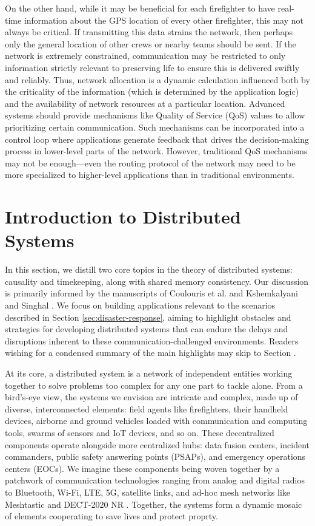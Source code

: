 \documentclass[]             %
{NASA}                       %
\theoremstyle{definition}
\begin{document}
On the other hand, while it may be beneficial for each firefighter to
have real-time information about the GPS location of every other
firefighter, this may not always be critical. If transmitting this
data strains the network, then perhaps only the general location of
other crews or nearby teams should be sent. If the network is
extremely constrained, communication may be restricted to only
information strictly relevant to preserving life to ensure this is
delivered swiftly and reliably. Thus, network allocation is a dynamic
calculation influenced both by the criticality of the information
(which is determined by the application logic) and the availability of
network resources at a particular location. Advanced systems should
provide mechanisms like Quality of Service (QoS) values to allow
prioritizing certain communication. Such mechanisms can be
incorporated into a control loop where applications generate feedback
that drives the decision-making process in lower-level parts of the
network. However, traditional QoS mechanisms may not be enough---even
the routing protocol of the network may need to be more specialized to
higher-level applications than in traditional environments.

\section{Introduction to Distributed Systems}
\label{sec:background}
In this section, we distill two core topics in the theory of
distributed systems: causality and timekeeping, along with shared
memory consistency.  Our discussion is primarily informed by the
manuscripts of Coulouris et al.  \cite{coulouris2005distributed} and
Kshemkalyani and Singhal \cite{kshemkalyani_singhal_2008}. We focus on
building applications relevant to the scenarios described in Section
\ref{sec:disaster-response}, aiming to highlight obstacles and
strategies for developing distributed systems that can endure the
delays and disruptions inherent to these communication-challenged
environments. Readers wishing for a condensed summary of the main
highlights may skip to Section \label{ssec:background-summary}.

At its core, a distributed system is a network of independent entities
working together to solve problems too complex for any one part to
tackle alone. From a bird’s-eye view, the systems we envision are
intricate and complex, made up of diverse, interconnected elements:
field agents like firefighters, their handheld devices, airborne and
ground vehicles loaded with communication and computing tools, swarms
of sensors and IoT devices, and so on. These decentralized components
operate alongside more centralized hubs: data fusion centers, incident
commanders, public safety answering points (PSAPs), and emergency
operations centers (EOCs). We imagine these components being woven
together by a patchwork of communication technologies ranging from
analog and digital radios to Bluetooth, Wi-Fi, LTE, 5G, satellite
links, and ad-hoc mesh networks like Meshtastic \citationneeded and
DECT-2020 NR \citationneeded. Together, the systems form a dynamic
mosaic of elements cooperating to save lives and protect proprty.
\end{document}
